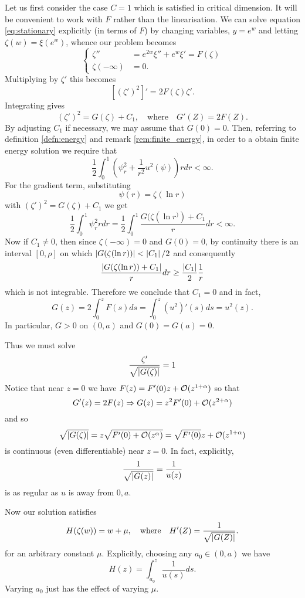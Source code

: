 \documentclass{amsart}
\begin{document}
Let us first consider the case \(C = 1\) which is satisfied in critical dimension. It will be convenient to work with \(F\) rather than the linearisation. We can solve equation \eqref{eq:stationary} explicitly (in terms of \(F\)) by changing variables, \(y = e^w\) and letting \(\zeta(w) = \xi(e^w)\), whence our problem becomes
\[
\begin{cases}
\zeta'' &= e^{2w} \xi'' + e^w \xi' = F (\zeta) \\
\zeta(-\infty) &= 0.
\end{cases}
\]
Multiplying by \(\zeta'\) this becomes
\[
[(\zeta')^2]' = 2 F (\zeta) \zeta'.
\]
Integrating gives
\[
(\zeta')^2 = G(\zeta) + C_1, \quad \text{where} \quad G'(Z) = 2 F(Z).
\]
By adjusting \(C_1\) if necessary, we may assume that \(G(0) = 0\). Then, referring to definition \ref{defn:energy} and remark \ref{rem:finite_energy}, in order to a obtain finite energy solution we require that
\[
\frac{1}{2} \int_0^1 \left(\psi_r^2 + \frac{1}{r^2} u^2(\psi)\right) r dr < \infty.
\]
For the gradient term, substituting
\[
\psi(r) = \zeta(\ln r)
\]
with \((\zeta')^2 = G(\zeta) + C_1\) we get
\[
\frac{1}{2} \int_0^1 \psi_r^2 r dr  = \frac{1}{2} \int_0^1 \frac{G(\zeta(\ln r^)) + C_1}{r} dr < \infty.
\]
Now if \(C_1 \ne 0\), then since \(\zeta(-\infty) = 0\) and \(G(0) = 0\), by continuity there is an interval \([0, \rho]\) on which \(\left|{G(\zeta(\ln r))}\right| < \left|{C_1}\right|/2\) and consequently
\[
\frac{\left|{G(\zeta(\ln r)) + C_1}\right|}{r} dr \geq \frac{\left|{C_1}\right|}{2} \frac{1}{r}
\]
which is not integrable. Therefore we conclude that \(C_1 = 0\) and in fact,
\begin{equation}
\label{eq:G}
G(z) = 2 \int_0^z F (s) ds = \int_0^z (u^2)' (s) ds = u^2 (z).
\end{equation}
In particular, \(G > 0\) on \((0,a)\) and \(G(0) = G(a) = 0\).

Thus we must solve
\[
\frac{\zeta'}{\sqrt{\left|{G(\zeta)}\right|}} = 1
\]
Notice that near \(z = 0\) we have \(F (z) = F'(0) z + \operatorname{\mathcal{O}}(z^{1+\alpha})\) so that
\[
G'(z) = 2F(z) \Rightarrow G(z) = z^2F'(0) + \operatorname{\mathcal{O}}(z^{2 + \alpha})
\]
and so
\[
\sqrt{\left|{G(\zeta)}\right|} = z \sqrt{F'(0) + \operatorname{\mathcal{O}}(z^{\alpha})} = \sqrt{F'(0)} z + \operatorname{\mathcal{O}}(z^{1 + \alpha})
\]
is continuous (even differentiable) near \(z = 0\). In fact, explicitly,
\[
\frac{1}{\sqrt{\left|{G(z)}\right|}} = \frac{1}{u(z)}
\]
is as regular as \(u\) is away from \(0, a\).

Now our solution satisfies
\[
H (\zeta(w)) = w + \mu, \quad \text{where} \quad H'(Z) = \frac{1}{\sqrt{\left|{G(Z)}\right|}}.
\]
for an arbitrary constant \(\mu\). Explicitly, choosing any \(a_0 \in (0, a)\) we have
\begin{equation}
\label{eq:H}
H(z) = \int_{a_0}^z \frac{1}{u(s)} ds.
\end{equation}
Varying \(a_0\) just has the effect of varying \(\mu\).
\end{document}
